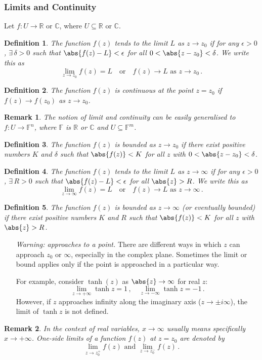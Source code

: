 \documentclass{article}
\theoremstyle{plain}\theoremheaderfont{\normalfont\itshape}\theorembodyfont{\rmfamily}\theoremseparator{.}\newtheorem*{rem}{Remark}\newtheorem*{ex}{Example}\newtheorem*{proof}{Proof}\newtheorem*{altp}{Alternative proof}
\theoremstyle{plain}\theoremheaderfont{\normalfont\bfseries}\theorembodyfont{\rmfamily}\theoremseparator{.}\newtheorem{thm}{Theorem}[section]\newtheorem{lem}[thm]{Lemma}\newtheorem{prop}[thm]{Proposition}\newtheorem*{cor}{Corollary}\newtheorem{defn}[thm]{Definition}\newtheorem{clm}[thm]{Claim}\newtheorem{clminproof}{Claim}
\theoremstyle{break}\theoremheaderfont{\normalfont\itshape}\theorembodyfont{\rmfamily}\theoremseparator{.\medskip}\newtheorem*{proofskip}{Proof}\newtheorem*{exs}{Examples}\newtheorem*{rems}{Remarks}
\theoremstyle{break}\theoremheaderfont{\normalfont\bfseries}\theorembodyfont{\rmfamily}\theoremseparator{.\medskip}\newtheorem{lemskip}[thm]{Lemma}\newtheorem{defnskip}[thm]{Definition}\newtheorem{propskip}[thm]{Proposition}\newtheorem{thmskip}[thm]{Theorem}
\numberwithin{equation}{section}
\begin{document}
	\subsubsection{Limits and Continuity}
	Let \(f:U\to\mathbb{R}\) or \(\mathbb{C}\), where \(U\subseteq \mathbb{R}\) or \(\mathbb{C}\).
	\begin{defn}
		The function \(f(z)\) tends to the \textit{limit} \(L\) as \(z\to z_0\) if for any \(\epsilon>0\), \(\exists\,\delta>0\) such that \(\abs{f(z)-L}<\epsilon\) for all \(0<\abs{z-z_0}<\delta\).	We write this as
		\[\lim_{z\to z_0}f(z)=L\quad\text{or}\quad f(z)\to L\text{ as }z\to z_0\,.\]
	\end{defn}
	\begin{defn}
		The function \(f(z)\) is \textit{continuous} at the point \(z=z_0\) if \(f(z)\to f(z_0)\) as \(z\to z_0\).
	\end{defn}
	\begin{rem}
		The notion of limit and continuity can be easily generalised to \(f:U\to\mathbb{F}^n\), where \(\mathbb{F}\) is \(\mathbb{R}\) or \(\mathbb{C}\) and \(U\subseteq\mathbb{F}^m\).
	\end{rem}
	\begin{defn}
		The function \(f(z)\) is \textit{bounded} as \(z\to z_0\) if there exist positive numbers \(K\) and \(\delta\) such that \(\abs{f(z)}<K\) for all \(z\) with \(0<\abs{z-z_0}<\delta\).
	\end{defn}
	\begin{defn}
		The function \(f(z)\) tends to the \textit{limit} \(L\) as \(z\to \infty\) if for any \(\epsilon>0\), \(\exists\,R>0\) such that \(\abs{f(z)-L}<\epsilon\) for all \(\abs{z}>R\). We write this as
		\[\lim_{z\to\infty}f(z)=L\quad\text{or}\quad f(z)\to L\text{ as }z\to\infty\,.\]
	\end{defn}
	\begin{defn}
		The function \(f(z)\) is \textit{bounded} as \(z\to\infty\) (or \textit{eventually bounded}) if there exist positive numbers \(K\) and \(R\) such that \(\abs{f(z)}<K\) for all \(z\) with \(\abs{z}>R\).
	\end{defn}
	\begin{itemize}[topsep=0pt,leftmargin=30pt,itemindent=115pt,parsep=1em]
		\item[\textit{Warning: approaches to a point.}] There are different ways in which \(z\) can approach \(z_0\) or \(\infty\), especially in the complex plane. Sometimes the limit or bound applies only if the point is approached in a particular way.
		
		For example, consider \(\tanh(z)\) as \(\abs{z}\to\infty\) for real \(z\):
		\[\lim_{z\to +\infty}\tanh z=1\,,\quad\lim_{z\to -\infty}\tanh z=-1\,.\]
		However, if \(z\) approaches infinity along the imaginary axis (\(z\to\pm i\infty\)), the limit of \(\tanh z\) is not defined.
	\end{itemize}
	\begin{rem}
		In the context of real variables, \(x\to\infty\) usually means specifically \(x\to+\infty\). One-side limits of a function \(f(z)\) at \(z=z_0\) are denoted by
		\[\lim_{z\to z_0^+}f(z)\text{ and }\lim_{z\to z_0^-}f(z)\,.\]
	\end{rem}
\end{document}
